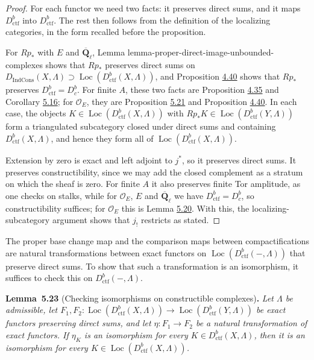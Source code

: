 \documentclass[11pt]{article}
\newenvironment{bpstatement}[2]{\par\addvspace{0.6\baselineskip}\noindent\textbf{#1}#2\textbf{.}\enspace\ignorespaces}
  {\par\addvspace{0.4\baselineskip}}
\newenvironment{bpstatementit}[2]{\begin{bpstatement}{#1}{#2}\itshape\ignorespaces}{\end{bpstatement}}
\providecommand{\Dbc}{}\renewcommand{\Dbc}{D^b_c}
\providecommand{\Dic}{}\renewcommand{\Dic}{D_{\IndCons}}
\providecommand{\IndCons}{}\renewcommand{\IndCons}{\operatorname{IndCons}}
\providecommand{\Loc}{}\renewcommand{\Loc}{\operatorname{Loc}}
\begin{document}
\begin{proof}[{Proof}]\label{bp483}%
For each functor we need two facts: it preserves direct sums, and it maps \(D^b_{\mathrm{ctf}}\) into \(D^b_{\mathrm{ctf}}\). The rest then follows from the definition of the localizing categories, in the form recalled before the proposition.

For \(Rp_*\) with \(E\) and \(\overline{\mathbf Q}_\ell\), Lemma lemma-proper-direct-image-unbounded-complexes shows that \(Rp_*\) preserves direct sums on \(\Dic(X,\Lambda)\supset\Loc(D^b_{\mathrm{ctf}}(X,\Lambda))\), and Proposition \hyperref[bp405]{4.40} shows that \(Rp_*\) preserves \(D^b_{\mathrm{ctf}}=\Dbc\). For finite \(A\), these two facts are Proposition \hyperref[bp390]{4.35} and Corollary \hyperref[bp457]{5.16}; for \(\mathcal O_E\), they are Proposition \hyperref[bp477]{5.21} and Proposition \hyperref[bp405]{4.40}. In each case, the objects \(K\in\Loc(D^b_{\mathrm{ctf}}(X,\Lambda))\) with \(Rp_*K\in\Loc(D^b_{\mathrm{ctf}}(Y,\Lambda))\) form a triangulated subcategory closed under direct sums and containing \(D^b_{\mathrm{ctf}}(X,\Lambda)\), and hence they form all of \(\Loc(D^b_{\mathrm{ctf}}(X,\Lambda))\).

Extension by zero is exact and left adjoint to \(j^*\), so it preserves direct sums. It preserves constructibility, since we may add the closed complement as a stratum on which the sheaf is zero. For finite \(A\) it also preserves finite Tor amplitude, as one checks on stalks, while for \(\mathcal O_E\), \(E\) and \(\overline{\mathbf Q}_\ell\) we have \(D^b_{\mathrm{ctf}}=\Dbc\), so constructibility suffices; for \(\mathcal O_E\) this is Lemma \hyperref[bp474]{5.20}. With this, the localizing-subcategory argument shows that \(j_!\) restricts as stated.
\end{proof}

\label{bp484}%
The proper base change map and the comparison maps between compactifications are natural transformations between exact functors on \(\Loc(D^b_{\mathrm{ctf}}(-,\Lambda))\) that preserve direct sums. To show that such a transformation is an isomorphism, it suffices to check this on \(D^b_{\mathrm{ctf}}(-,\Lambda)\).

\label{bp485}%
\begin{bpstatementit}{Lemma~5.23}{ (Checking isomorphisms on constructible complexes)}
Let \(\Lambda\) be admissible, let \(F_1,F_2:\Loc(D^b_{\mathrm{ctf}}(X,\Lambda))\to\Loc(D^b_{\mathrm{ctf}}(Y,\Lambda))\) be exact functors preserving direct sums, and let \(\eta:F_1\to F_2\) be a natural transformation of exact functors. If \(\eta_K\) is an isomorphism for every \(K\in D^b_{\mathrm{ctf}}(X,\Lambda)\), then it is an isomorphism for every \(K\in\Loc(D^b_{\mathrm{ctf}}(X,\Lambda))\).
\end{bpstatementit}
\end{document}
